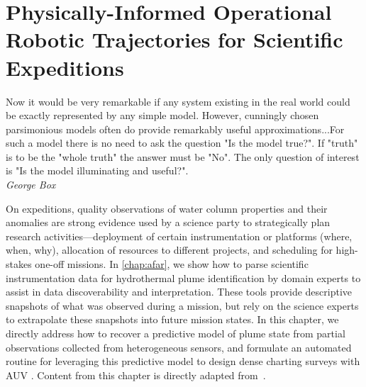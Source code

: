 \chapter{Physically-Informed Operational Robotic Trajectories for Scientific Expeditions}
\label{chap:phortex}

\begin{center}
    \begin{minipage}{0.7\textwidth}
      \begin{small}
        Now it would be very remarkable if any system existing in the real world could be exactly represented by any simple model. However, cunningly chosen parsimonious models often do provide remarkably useful approximations...For such a model there is no need to ask the question "Is the model true?". If "truth" is to be the "whole truth" the answer must be "No". The only question of interest is "Is the model illuminating and useful?".\\ \emph{George Box}
      \end{small}
    \end{minipage}
    \vspace{0.5cm}
\end{center}


On expeditions, quality observations of water column properties and their anomalies are strong evidence used by a science party to strategically plan research activities---deployment of certain instrumentation or platforms (where, when, why), allocation of resources to different projects, and scheduling for high-stakes one-off missions. In \cref{chap:afar}, we show how to parse scientific instrumentation data for hydrothermal plume identification by domain experts to assist in data discoverability and interpretation. These tools provide descriptive snapshots of what was observed during a mission, but rely on the science experts to extrapolate these snapshots into future mission states. In this chapter, we directly address how to recover a predictive model of plume state from partial observations collected from heterogeneous sensors, and formulate an automated routine for leveraging this predictive model to design dense charting surveys with AUV \Sentry. Content from this chapter is directly adapted from~\cite{preston2022physically}.

